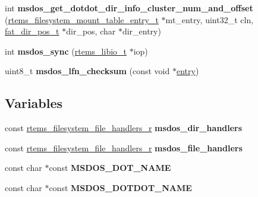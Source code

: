 \begin{DoxyCompactItemize}
int {\bfseries msdos\+\_\+get\+\_\+dotdot\+\_\+dir\+\_\+info\+\_\+cluster\+\_\+num\+\_\+and\+\_\+offset} (\mbox{\hyperlink{structrtems__filesystem__mount__table__entry__tt}{rtems\+\_\+filesystem\+\_\+mount\+\_\+table\+\_\+entry\+\_\+t}} $\ast$mt\+\_\+entry, uint32\+\_\+t cln, \mbox{\hyperlink{structfat__dir__pos__s}{fat\+\_\+dir\+\_\+pos\+\_\+t}} $\ast$dir\+\_\+pos, char $\ast$dir\+\_\+entry)
\item 
\mbox{\label{group__libfs__msdos_ga9bfc3368e01c8855f80bc403db71c9c6}} 
int {\bfseries msdos\+\_\+sync} (\mbox{\hyperlink{structrtems__libio__tt}{rtems\+\_\+libio\+\_\+t}} $\ast$iop)
\item 
\mbox{\label{group__libfs__msdos_gaa7a9edcd4e017a43dd77b87c9a2ee20a}} 
uint8\+\_\+t {\bfseries msdos\+\_\+lfn\+\_\+checksum} (const void $\ast$\mbox{\hyperlink{structentry}{entry}})
\end{DoxyCompactItemize}
\subsection*{Variables}
\begin{DoxyCompactItemize}
\item 
\mbox{\label{group__libfs__msdos_gaca3ce4eb8ca8b53339c77e942ba706bf}} 
const \mbox{\hyperlink{struct__rtems__filesystem__file__handlers__r}{rtems\+\_\+filesystem\+\_\+file\+\_\+handlers\+\_\+r}} {\bfseries msdos\+\_\+dir\+\_\+handlers}
\item 
\mbox{\label{group__libfs__msdos_ga74495f8ab7bdaf5f7a3dd5b9eacd6657}} 
const \mbox{\hyperlink{struct__rtems__filesystem__file__handlers__r}{rtems\+\_\+filesystem\+\_\+file\+\_\+handlers\+\_\+r}} {\bfseries msdos\+\_\+file\+\_\+handlers}
\item 
\mbox{\label{group__libfs__msdos_ga00b8a5badf7efb86ceac735089227d3c}} 
const char $\ast$const {\bfseries M\+S\+D\+O\+S\+\_\+\+D\+O\+T\+\_\+\+N\+A\+ME}
\item 
\mbox{\label{group__libfs__msdos_gaf8c8c279aac6b14d10936db67f0830e5}} 
const char $\ast$const {\bfseries M\+S\+D\+O\+S\+\_\+\+D\+O\+T\+D\+O\+T\+\_\+\+N\+A\+ME}
\end{DoxyCompactItemize}


